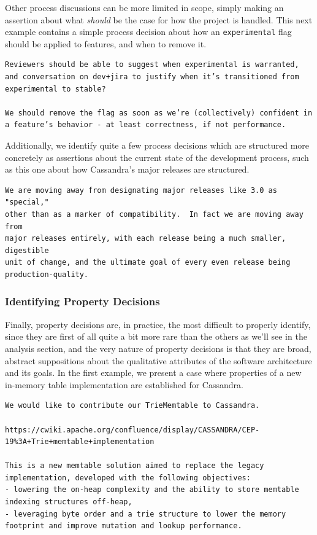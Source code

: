 \documentclass[a4paper, 12pt]{article}
\begin{document}
			Other process discussions can be more limited in scope, simply making an assertion about what \textit{should} be the case for how the project is handled. This next example contains a simple process decision about how an \texttt{experimental} flag should be applied to features, and when to remove it.
			\begin{verbatim}
Reviewers should be able to suggest when experimental is warranted, and conversation on dev+jira to justify when it’s transitioned from experimental to stable?

We should remove the flag as soon as we’re (collectively) confident in a feature’s behavior - at least correctness, if not performance. 
			\end{verbatim}
			Additionally, we identify quite a few process decisions which are structured more concretely as assertions about the current state of the development process, such as this one about how Cassandra's major releases are structured.
			\begin{verbatim}
We are moving away from designating major releases like 3.0 as "special,"
other than as a marker of compatibility.  In fact we are moving away from
major releases entirely, with each release being a much smaller, digestible
unit of change, and the ultimate goal of every even release being
production-quality.
			\end{verbatim}
			
		\subsubsection{Identifying \textbf{Property} Decisions}
			Finally, property decisions are, in practice, the most difficult to properly identify, since they are first of all quite a bit more rare than the others as we'll see in the analysis section, and the very nature of property decisions is that they are broad, abstract suppositions about the qualitative attributes of the software architecture and its goals. In the first example, we present a case where properties of a new in-memory table implementation are established for Cassandra.
			\begin{verbatim}
We would like to contribute our TrieMemtable to Cassandra. 

https://cwiki.apache.org/confluence/display/CASSANDRA/CEP-19%3A+Trie+memtable+implementation 

This is a new memtable solution aimed to replace the legacy implementation, developed with the following objectives:
- lowering the on-heap complexity and the ability to store memtable indexing structures off-heap,
- leveraging byte order and a trie structure to lower the memory footprint and improve mutation and lookup performance.
			\end{verbatim}
		
\end{document}
